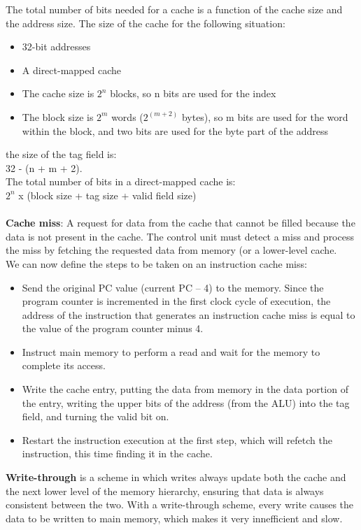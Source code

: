 \documentclass[letterpaper,c12pt]{article}
\begin{document}
The total number of bits needed for a cache is a function of the cache size and the address size. The size of the cache for the following situation:
\begin{itemize}
	\item 32-bit addresses
	\item A direct-mapped cache
	\item The cache size is $2^n$ blocks, so n bits are used for the index
	\item The block size is $2^m$ words ($2^(m+2)$ bytes), so m bits are used for the word within the block, and two bits are used for the byte part of the address
\end{itemize}
the size of the tag field is:\\
32 - (n + m + 2). \\
The total number of bits in a direct-mapped cache is:\\
$2^n$ x (block size + tag size + valid field size)\\\\
\textbf{Cache miss}: A request for data from the cache that cannot be filled because the data is not present in the cache. The control unit must detect a miss and process the miss by fetching the requested data from memory (or a lower-level cache.\\We can now define the steps to be taken on an instruction cache miss:
\begin{itemize}
	\item Send the original PC value (current PC – 4) to the memory. Since the program counter is incremented in the first clock cycle of execution, the address of the instruction that generates an instruction cache miss is equal to the value of the program counter minus 4.
	\item Instruct main memory to perform a read and wait for the memory to complete its access.
	\item Write the cache entry, putting the data from memory in the data portion of the entry, writing the upper bits of the address (from the ALU) into the tag field, and turning the valid bit on.
	\item Restart the instruction execution at the first step, which will refetch the instruction, this time finding it in the cache.
	\\
\end{itemize}
\textbf{Write-through} is a scheme in which writes always update both the cache and the next lower level of the memory hierarchy, ensuring that data is always consistent between the two. With a write-through scheme, every write causes the data to be written to main memory, which makes it very innefficient and slow.\\\\
\end{document}
